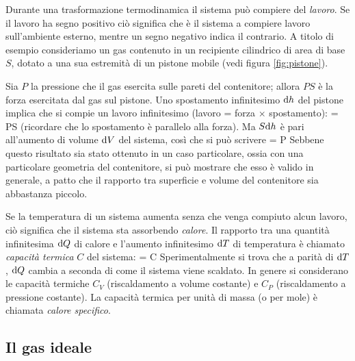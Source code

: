 Durante una trasformazione termodinamica il sistema può compiere del {\em lavoro}. Se il lavoro ha segno positivo ciò significa che è il sistema a compiere lavoro sull'ambiente esterno, mentre un segno negativo indica il contrario. A titolo di esempio consideriamo un gas contenuto in un recipiente cilindrico di area di base $S$, dotato a una sua estremità di un pistone mobile (vedi figura \ref{fig:pistone}). 

Sia $P$ la pressione che il gas esercita sulle pareti del contenitore; allora $PS$ è la forza esercitata dal gas sul pistone. Uno spostamento infinitesimo ${\textrm d}h$ del pistone implica che si compie un lavoro infinitesimo (lavoro = forza $\times$ spostamento):
\be
\label{eq:lavoro_1}
 = PS
\ee
(ricordare che lo spostamento è parallelo alla forza). Ma $S{\textrm d}h$ è pari all'aumento di volume ${\textrm d}V$ del sistema, così che si può scrivere
\be
\label{eq:lavoro_2}
 = P
\ee
Sebbene questo risultato sia stato ottenuto in un caso particolare, ossia con una particolare geometria del contenitore, si può mostrare che esso è valido in generale, a patto che il rapporto tra superficie e volume del contenitore sia abbastanza piccolo.

Se la temperatura di un sistema aumenta senza che venga compiuto alcun lavoro, ciò significa che il sistema sta assorbendo {\em calore}. Il rapporto tra una quantità infinitesima ${\textrm d}Q$ di calore e l'aumento infinitesimo ${\textrm d}T$ di temperatura è chiamato {\em capacità termica} $C$ del sistema:
\be
\label{eq:cap_termica}
 = C
\ee
Sperimentalmente si trova che a parità di ${\textrm d}T$, ${\textrm d}Q$ cambia a seconda di come il sistema viene scaldato. In genere si considerano le capacità termiche $C_{V}$ (riscaldamento a volume costante) e $C_{P}$ (riscaldamento a pressione costante). La capacità termica per unità di massa (o per mole) è chiamata {\em calore specifico}.

\subsection{Il gas ideale}

